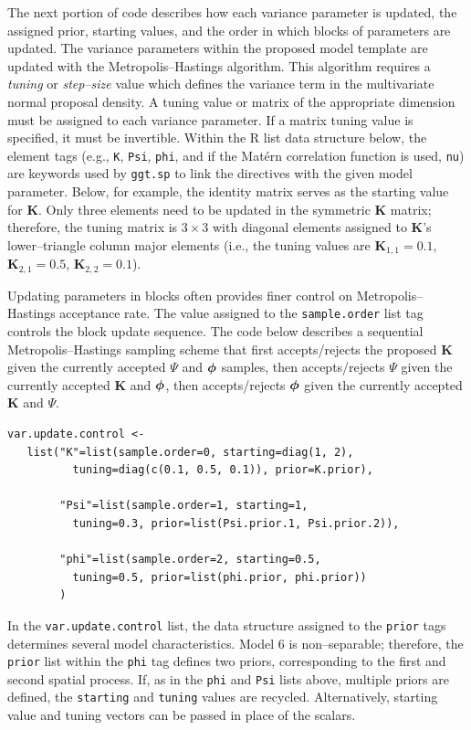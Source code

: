 \documentclass[a4paper]{article}
\newcommand{\bphi}{ \mbox{\boldmath $\phi$}}
\newcommand{\bK}{\textbf{K}}
\let\code=\texttt
\let\proglang=\textsf
\begin{document}
The next portion of code describes how each variance parameter is
updated, the assigned prior, starting values, and the order in which
blocks of parameters are updated.  The variance parameters within
the proposed model template are updated with the
Metropolis--Hastings algorithm.  This algorithm requires a
\emph{tuning} or \emph{step--size} value which defines the variance
term in the multivariate normal proposal density.  A tuning value or matrix of the
appropriate dimension must be assigned to each variance parameter.
If a matrix tuning value is specified, it must be invertible. Within
the \proglang{R} list data structure below, the element tags (e.g.,
\code{K}, \code{Psi}, \code{phi}, and if the Mat\'{e}rn
correlation function is used, \code{nu}) are keywords used by \code{ggt.sp} to
link the directives with the given model parameter. Below, for
example, the identity matrix serves as the starting value for $\bK$.
Only three elements need to be updated in the symmetric $\bK$
matrix; therefore, the tuning matrix is $3\times 3$ with diagonal
elements assigned to $\bK$'s lower--triangle column major
elements (i.e., the tuning values are $\bK_{1,1} = 0.1$, $\bK_{2,1}
= 0.5$, $\bK_{2,2} = 0.1$).

Updating parameters in blocks often provides finer control on
Metropolis--Hastings acceptance rate. The value assigned to the
\code{sample.order} list tag controls the block update sequence. The
code below describes a sequential Metropolis--Hastings sampling
scheme that first accepts/rejects the proposed $\bK$ given the
currently accepted $\Psi$ and $\bphi$ samples, then accepts/rejects
$\Psi$ given the currently accepted $\bK$ and $\bphi$, then
accepts/rejects $\bphi$ given the currently accepted $\bK$ and
$\Psi$.
 \begin{verbatim}
var.update.control <-
   list("K"=list(sample.order=0, starting=diag(1, 2),
          tuning=diag(c(0.1, 0.5, 0.1)), prior=K.prior),

        "Psi"=list(sample.order=1, starting=1,
          tuning=0.3, prior=list(Psi.prior.1, Psi.prior.2)),

        "phi"=list(sample.order=2, starting=0.5,
          tuning=0.5, prior=list(phi.prior, phi.prior))
        )
 \end{verbatim}
In the \code{var.update.control} list, the data structure assigned
to the \code{prior} tags determines several model characteristics.
Model 6 is non--separable; therefore, the \code{prior} list within
the \code{phi} tag defines two priors, corresponding to the first
and second spatial process.  If, as in the \code{phi} and \code{Psi}
lists above, multiple priors are defined, the \code{starting} and
\code{tuning} values are recycled.  Alternatively, starting value
and tuning vectors can be passed in place of the scalars.
\end{document}
